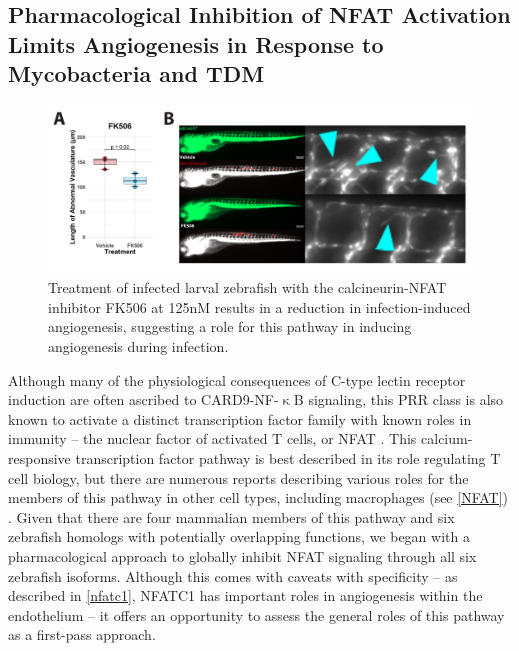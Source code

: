 \subsection{Pharmacological Inhibition of NFAT Activation Limits Angiogenesis in Response to Mycobacteria and TDM}

\begin{figure}
\centering
\includegraphics[width=\textwidth]{images/fk506inf.pdf}
\caption{Treatment of infected larval zebrafish with the calcineurin-NFAT inhibitor FK506 at 125nM results in a reduction in infection-induced angiogenesis, suggesting a role for this pathway in inducing angiogenesis during infection.}
\label{figure:fk506inf}
\end{figure}

Although many of the physiological consequences of C-type lectin receptor induction are often ascribed to CARD9-NF-$\upkappa$B signaling, this PRR class is also known to activate a distinct transcription factor family with known roles in immunity -- the nuclear factor of activated T cells, or NFAT \citep{Goodridge2007, Deerhake2021}. This calcium-responsive transcription factor pathway is best described in its role regulating T cell biology, but there are numerous reports describing various roles for the members of this pathway in other cell types, including macrophages (see \autoref{NFAT}) \citep{Symes1998, Jones2000, Crabtree2002, Horsley2002, Elloumi2012}. Given that there are four mammalian members of this pathway and six zebrafish homologs with potentially overlapping functions, we began with a pharmacological approach to globally inhibit NFAT signaling through all six zebrafish isoforms. Although this comes with caveats with specificity -- as described in \autoref{nfatc1}, NFATC1 has important roles in angiogenesis within the endothelium -- it offers an opportunity to assess the general roles of this pathway as a first-pass approach. 


